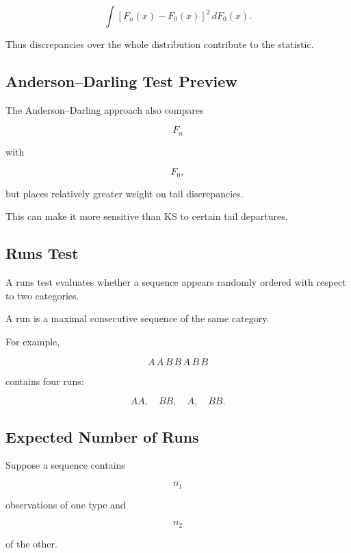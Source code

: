 \[
\boxed{
\int
[
F_n(x)-F_0(x)
]^2
\,dF_0(x).
}
\]

Thus discrepancies over the whole distribution contribute to the
statistic.

\subsection{Anderson--Darling Test Preview}
\label{subsec:anderson-darling-preview}

The Anderson--Darling approach also compares

\[
F_n
\]

with

\[
F_0,
\]

but places relatively greater weight on tail discrepancies.

This can make it more sensitive than KS to certain tail departures.

\subsection{Runs Test}
\label{subsec:runs-test}

A runs test evaluates whether a sequence appears randomly ordered with
respect to two categories.

A run is a maximal consecutive sequence of the same category.

For example,

\[
A\,A\,B\,B\,A\,B\,B
\]

contains four runs:

\[
AA,
\quad
BB,
\quad
A,
\quad
BB.
\]

\subsection{Expected Number of Runs}
\label{subsec:expected-runs}

Suppose a sequence contains

\[
n_1
\]

observations of one type and

\[
n_2
\]

of the other.

